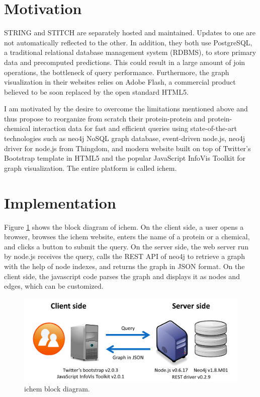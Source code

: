 \documentclass[10pt,conference,compsocconf]{../IEEEtran}
\begin{document}
\section{Motivation}

STRING and STITCH are separately hosted and maintained. Updates to one are not automatically reflected to the other. In addition, they both use PostgreSQL, a traditional relational database management system (RDBMS), to store primary data and precomputed predictions. This could result in a large amount of join operations, the bottleneck of query performance. Furthermore, the graph visualization in their websites relies on Adobe Flash, a commercial product believed to be soon replaced by the open standard HTML5.

I am motivated by the desire to overcome the limitations mentioned above and thus propose to reorganize from scratch their protein-protein and protein-chemical interaction data for fast and efficient queries using state-of-the-art technologies such as neo4j NoSQL graph database, event-driven node.js, neo4j driver for node.js from Thingdom, and modern website built on top of Twitter's Bootstrap template in HTML5 and the popular JavaScript InfoVis Toolkit for graph visualization. The entire platform is called ichem.

\section{Implementation}

Figure \ref{fig:BlockDiagram} shows the block diagram of ichem. On the client side, a user opens a browser, browses the ichem website, enters the name of a protein or a chemical, and clicks a button to submit the query. On the server side, the web server run by node.js receives the query, calls the REST API of neo4j to retrieve a graph with the help of node indexes, and returns the graph in JSON format. On the client side, the javascript code parses the graph and displays it as nodes and edges, which can be customized.

\begin{figure}
\centering
\includegraphics[width=\linewidth]{BlockDiagram.png}
\caption{ichem block diagram.}
\label{fig:BlockDiagram}
\end{figure}
\end{document}
